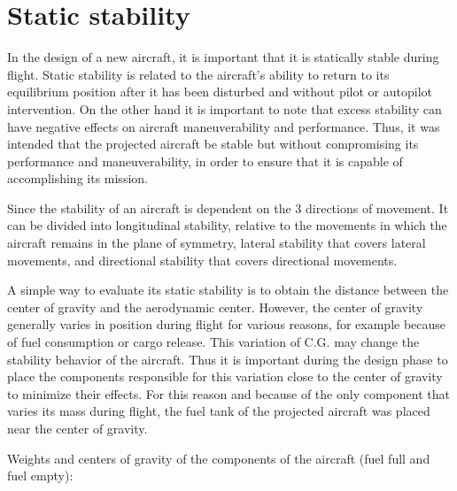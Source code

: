 \documentclass[english,fira]{ist-report}
\begin{document}
\section{Static stability}
In the design of a new aircraft, it is important that it is statically stable during flight. Static stability is related to the aircraft's ability to return to its equilibrium position after it has been disturbed and without pilot or autopilot intervention. On the other hand it is important to note that excess stability can have negative effects on aircraft maneuverability and performance. Thus, it was intended that the projected aircraft be stable but without compromising its performance and maneuverability, in order to ensure that it is capable of accomplishing its mission. 

Since the stability of an aircraft is dependent on the $3$ directions of movement. It can be divided into longitudinal stability, relative to the movements in which the aircraft remains in the plane of symmetry, lateral stability that covers lateral movements, and directional stability that covers directional movements. 

A simple way to evaluate its static stability is to obtain the distance between the center of gravity and the aerodynamic center. However, the center of gravity generally varies in position during flight for various reasons, for example because of fuel consumption or cargo release. This variation of C.G. may change the stability behavior of the aircraft. Thus it is important during the design phase to place the components responsible for this variation close to the center of gravity to minimize their effects. For this reason and because of the only component that varies its mass during flight, the fuel tank of the projected aircraft was placed near the center of gravity.

Weights and centers of gravity of the components of the aircraft (fuel full and fuel empty):
\end{document}
